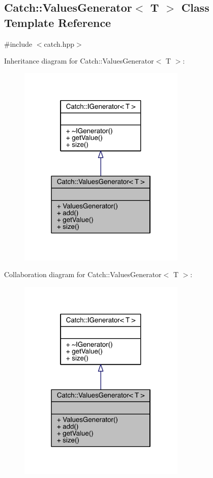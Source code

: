 \hypertarget{a00091}{}\subsection{Catch\+:\+:Values\+Generator$<$ T $>$ Class Template Reference}
\label{a00091}


{\ttfamily \#include $<$catch.\+hpp$>$}



Inheritance diagram for Catch\+:\+:Values\+Generator$<$ T $>$\+:\nopagebreak
\begin{figure}[H]
\begin{center}
\leavevmode
\includegraphics[width=226pt]{a00296}
\end{center}
\end{figure}


Collaboration diagram for Catch\+:\+:Values\+Generator$<$ T $>$\+:\nopagebreak
\begin{figure}[H]
\begin{center}
\leavevmode
\includegraphics[width=226pt]{a00297}
\end{center}
\end{figure}
